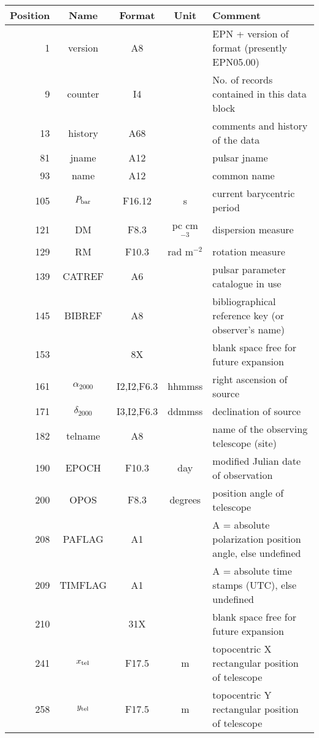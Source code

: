 \documentclass[11pt]{article}
\begin{document}
\begin{table}
\begin{center}
\footnotesize
\begin{tabular}{|rcccp{8cm}|}
\hline
Position & Name & Format & Unit & Comment \\
\hline 
\hline
1   &  version &  A8 & &  EPN + version of format (presently EPN05.00)\\
9   &  counter &  I4 & &  No. of records contained in this data block\\
13  &  history & A68  &  &comments and history of the data \\
\hline
81    & jname &  A12 & &  pulsar jname \\
93   & name & A12 &  & common name              \\
105   & $P_{\rm bar}$ &  F16.12 & s & current barycentric period\\
121    & DM      &  F8.3   & pc cm$^{-3}$& dispersion measure\\
129   & RM      &  F10.3  & rad m$^{-2}$ & rotation measure \\
139  & CATREF &  A6   & & pulsar parameter catalogue in use \\
145   & BIBREF    &  A8     & & bibliographical reference key (or observer's name) \\
153   &         & 8X   &  &  blank space free for future expansion \\
\hline
161   & $\alpha_{2000}$  & I2,I2,F6.3 & hhmmss& right ascension of source \\
171   & $\delta_{2000}$ & I3,I2,F6.3 & ddmmss& declination of source\\
182  & telname   & A8  & & name of the observing telescope (site) \\
190  & EPOCH  & F10.3 & day & modified Julian date of observation \\
200  & OPOS   & F8.3  & degrees & position angle of telescope \\
208  & PAFLAG & A1    &  &  A = absolute polarization position angle, else undefined\\
209  & TIMFLAG & A1   &  &  A = absolute time stamps (UTC), else undefined \\
210 &         & 31X   &  &  blank space free for future expansion \\
\hline
241  & $x_{\rm tel}$& F17.5& m & topocentric X rectangular position of telescope \\
258  & $y_{\rm tel}$& F17.5& m & topocentric Y rectangular position of telescope \\

\end{tabular}
\end{center}
\end{table}
\end{document}
